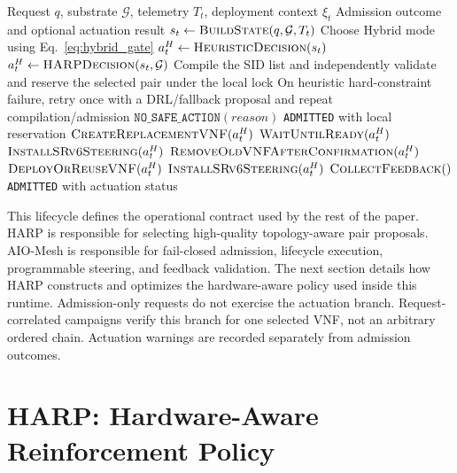 \documentclass[final,5p]{elsarticle}
\newcommand{\rev}[1]{\textcolor{revisiongreen}{#1}}
\let\newrev\rev
\begin{document}
\begin{algorithm}[t]
\caption{AIO-Mesh request lifecycle \newrev{(single-VNF realization)}}
\label{alg:aiomesh_lifecycle}\label{alg:aio_mesh_lifecycle}
\small
\begin{algorithmic}[1]
\Require Request \(q\), substrate \(\mathcal G\), telemetry \(T_t\), deployment context \(\xi_t\)
\Ensure Admission outcome and optional actuation result
\State \(s_t\gets\textsc{BuildState}(q,\mathcal G,T_t)\)
\State \newrev{Choose Hybrid mode using Eq.~\eqref{eq:hybrid_gate}}
    \State \(a_t^H\gets\textsc{HeuristicDecision}(s_t)\)
\Else
    \State \(a_t^H\gets\textsc{HARPDecision}(s_t,\mathcal G)\)
\EndIf
\State \newrev{Compile the SID list and independently validate and reserve the selected pair under the local lock}
\State \newrev{On heuristic hard-constraint failure, retry once with a DRL/fallback proposal and repeat compilation/admission}
    \State \Return \(\texttt{NO\_SAFE\_ACTION}(reason)\)
\EndIf
\If{\newrev{actuation is not requested}}
    \State \Return \texttt{ADMITTED} with local reservation
\EndIf
\If{\newrev{the lifecycle context \(\xi_t\) requires migration}}
    \State \(\textsc{CreateReplacementVNF}(a_t^H)\)
    \State \(\textsc{WaitUntilReady}(a_t^H)\)
    \State \(\textsc{InstallSRv6Steering}(a_t^H)\)
    \State \(\textsc{RemoveOldVNFAfterConfirmation}(a_t^H)\)
\Else
    \State \(\textsc{DeployOrReuseVNF}(a_t^H)\)
    \State \(\textsc{InstallSRv6Steering}(a_t^H)\)
\EndIf
\State \(\textsc{CollectFeedback}()\)
\State \Return \texttt{ADMITTED} with actuation status
\end{algorithmic}
\end{algorithm}

This lifecycle defines the operational contract used by the rest of the paper. HARP is responsible for selecting high-quality topology-aware \newrev{pair proposals}. AIO-Mesh is responsible for fail-closed admission, lifecycle execution, programmable steering, and feedback validation. The next section details how HARP constructs and optimizes the hardware-aware policy used inside this runtime. \newrev{Admission-only requests do not exercise the actuation branch. Request-correlated campaigns verify this branch for one selected VNF, not an arbitrary ordered chain. Actuation warnings are recorded separately from admission outcomes.}

\section{HARP: Hardware-Aware Reinforcement Policy}
\label{sec:harp}
\end{document}
